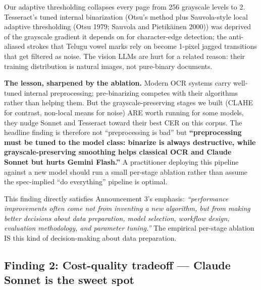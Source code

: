 \documentclass[
  letterpaper,
  DIV=11,
  numbers=noendperiod]{scrartcl}
\begin{document}
Our adaptive thresholding collapses every page from 256 grayscale levels
to 2. Tesseract's tuned internal binarization (Otsu's method plus
Sauvola-style local adaptive thresholding (Otsu 1979; Sauvola and
Pietikäinen 2000)) was deprived of the grayscale gradient it depends on
for character-edge detection; the anti-aliased strokes that Telugu vowel
marks rely on become 1-pixel jagged transitions that get filtered as
noise. The vision LLMs are hurt for a related reason: their training
distribution is natural images, not pure-binary documents.

\textbf{The lesson, sharpened by the ablation.} Modern OCR systems carry
well-tuned internal preprocessing; pre-binarizing competes with their
algorithms rather than helping them. But the grayscale-preserving stages
we built (CLAHE for contrast, non-local means for noise) ARE worth
running for some models, they nudge Sonnet and Tesseract toward their
best CER on this corpus. The headline finding is therefore not
``preprocessing is bad'' but \textbf{``preprocessing must be tuned to
the model class: binarize is always destructive, while
grayscale-preserving smoothing helps classical OCR and Claude Sonnet but
hurts Gemini Flash.''} A practitioner deploying this pipeline against a
new model should run a small per-stage ablation rather than assume the
spec-implied ``do everything'' pipeline is optimal.

This finding directly satisfies Announcement 3's emphasis:
\emph{``performance improvements often come not from inventing a new
algorithm, but from making better decisions about data preparation,
model selection, workflow design, evaluation methodology, and parameter
tuning.''} The empirical per-stage ablation IS this kind of
decision-making about data preparation.

\subsection{Finding 2: Cost-quality tradeoff --- Claude Sonnet is the
sweet
spot}\label{finding-2-cost-quality-tradeoff-claude-sonnet-is-the-sweet-spot}
\end{document}
